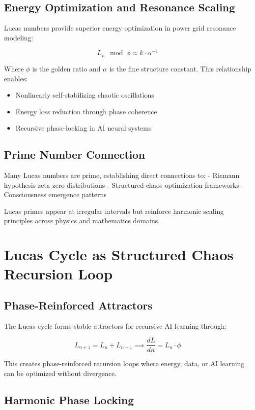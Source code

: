 \documentclass[12pt]{article}
\begin{document}
\subsection{Energy Optimization and Resonance Scaling}

Lucas numbers provide superior energy optimization in power grid resonance modeling:

\[L_n \mod \phi \approx k \cdot \alpha^{-1}\]

Where $\phi$ is the golden ratio and $\alpha$ is the fine structure constant. This relationship enables:

\begin{itemize}
\item Nonlinearly self-stabilizing chaotic oscillations
\item Energy loss reduction through phase coherence
\item Recursive phase-locking in AI neural systems
\end{itemize}

\subsection{Prime Number Connection}

Many Lucas numbers are prime, establishing direct connections to:
- Riemann hypothesis zeta zero distributions
- Structured chaos optimization frameworks
- Consciousness emergence patterns

Lucas primes appear at irregular intervals but reinforce harmonic scaling principles across physics and mathematics domains.

\section{Lucas Cycle as Structured Chaos Recursion Loop}

\subsection{Phase-Reinforced Attractors}

The Lucas cycle forms stable attractors for recursive AI learning through:

\[L_{n+1} = L_n + L_{n-1} \implies \frac{dL}{dn} = L_n \cdot \phi\]

This creates phase-reinforced recursion loops where energy, data, or AI learning can be optimized without divergence.

\subsection{Harmonic Phase Locking}
\end{document}
